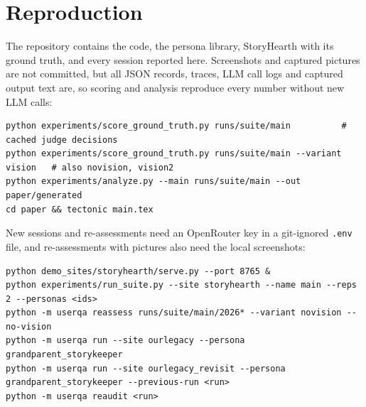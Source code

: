 \documentclass[10pt,twocolumn]{article}
\newcommand{\site}{StoryHearth}
\begin{document}
\section{Reproduction}
\label{app:repro}

The repository contains the code, the persona library, \site{} with its ground truth, and every session reported here. Screenshots and captured pictures are not committed, but all JSON records, traces, LLM call logs and captured output text are, so scoring and analysis reproduce every number without new LLM calls:

{\small
\begin{verbatim}
python experiments/score_ground_truth.py runs/suite/main          # cached judge decisions
python experiments/score_ground_truth.py runs/suite/main --variant vision   # also novision, vision2
python experiments/analyze.py --main runs/suite/main --out paper/generated
cd paper && tectonic main.tex
\end{verbatim}
}

\noindent New sessions and re-assessments need an OpenRouter key in a git-ignored \texttt{.env} file, and re-assessments with pictures also need the local screenshots:

{\small
\begin{verbatim}
python demo_sites/storyhearth/serve.py --port 8765 &
python experiments/run_suite.py --site storyhearth --name main --reps 2 --personas <ids>
python -m userqa reassess runs/suite/main/2026* --variant novision --no-vision
python -m userqa run --site ourlegacy --persona grandparent_storykeeper
python -m userqa run --site ourlegacy_revisit --persona grandparent_storykeeper --previous-run <run>
python -m userqa reaudit <run>
\end{verbatim}
}
\end{document}
